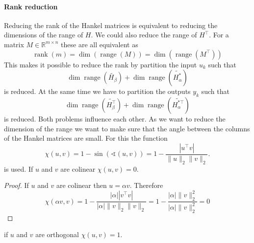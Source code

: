 \documentclass[doctype=mastersthesis,BCOR=15mm,biblatex]{ldvbook}%
\DeclareMathOperator{\rank}{rank}
\DeclareMathOperator{\range}{range}
\begin{document}
\paragraph{Rank reduction}
Reducing the rank of the Hankel matrices is equivalent to reducing the dimensions of the range of $H$.
We could also reduce the range of $H^\top$.
For a matrix $M\in \mathbb{R}^{m\times n}$ these are all equivalent as 
\begin{equation}
\rank(m) = \dim(\range(M)) = \dim(\range(M^\top))
\end{equation}
This makes it possible to reduce the rank by partition the input $u_k$ such that 
\begin{equation}
	\dim\range(\tilde{H_\beta}) + \dim\range(\tilde{H_\alpha^*})
\end{equation}
is reduced. At the same time we have to partition the outputs $y_k$ such that 
\begin{equation}
\dim\range(\tilde{H^\top_\beta}) + \dim\range(\tilde{H_\alpha^{*\top}})
\end{equation}
is reduced.
Both problems influence each other.
As we want to reduce the dimension of the range we want to make sure that the angle between the columns of the Hankel matrices are small. %
For this the function 
\begin{equation}
	\chi(u,v) =  1-\sin(\sphericalangle(u,v)) =1-\frac{|u^\top v|}{\|u\|_2\|v\|_2}
	.
\end{equation}
is used.
If $u$ and $v$ are colinear $\chi(u,v) = 0$.
\begin{proof}
	If $u$ and $v$ are colinear then $u = \alpha v$. Therefore
	\begin{equation}
		\chi(\alpha v,v) = 1-\frac{|\alpha| |v^\top v|}{|\alpha|\|v\|_2\|v\|_2}= 1-\frac{|\alpha| \|v\|_2^2}{|\alpha| \|v\|_2^2} = 0
	\end{equation}
\end{proof}
if $u$ and $v$ are orthogonal $\chi(u,v) = 1$.
\end{document}
